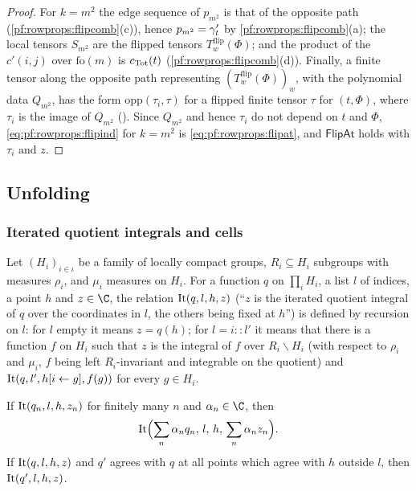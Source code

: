 \begin{proof}
For $k=m^2$ the edge sequence of $p_{m^2}$ is that of the opposite path (\cref{pf:rowprops:flipcomb}(c)), hence
$p_{m^2}=\gamma'_t$ by \cref{pf:rowprops:flipcomb}(a); the local tensors $S_{m^2}$ are the flipped tensors
$T^{\mathrm{flip}}_w(\Phi)$; and the product of the $c'(i,j)$ over $\mathrm{fo}(m)$ is $c_{\mathrm{Tot}}(t)$
(\cref{pf:rowprops:flipcomb}(d)). Finally, a finite tensor along the opposite path representing $(T^{\mathrm{flip}}_w(\Phi))_w$,
with the polynomial data $Q_{m^2}$, has the form $\mathrm{opp}(\tau_i,\tau)$ for a flipped finite tensor $\tau$ for $(t,\Phi)$,
where $\tau_i$ is the image of $Q_{m^2}$ ().
Since $Q_{m^2}$ and hence $\tau_i$ do not depend on $t$ and $\Phi$, \eqref{eq:pf:rowprops:flipind} for $k=m^2$ is
\eqref{eq:pf:rowprops:flipat}, and $\mathsf{FlipAt}$ holds with $\tau_i$ and $z$.
\end{proof}

\subsection{Unfolding}\label{sec:pf:rowprops:unfold}

\subsubsection{Iterated quotient integrals and cells}
\begin{definition}\label{def:pf:rowprops:niter}
Let $(H_i)_{i\in\iota}$ be a family of locally compact groups, $R_i\subseteq H_i$ subgroups with measures $\rho_i$, and
$\mu_i$ measures on $H_i$. For a function $q$ on $\prod_iH_i$, a list $l$ of indices, a point $h$ and $z\in\C$, the relation
$\mathrm{It}(q,l,h,z)$ (``$z$ is the iterated quotient integral of $q$ over the coordinates in $l$, the others being
fixed at $h$'') is defined by recursion on $l$: for $l$ empty it means $z=q(h)$; for $l=i::l'$ it means that there is a
function $f$ on $H_i$ such that $z$ is the integral of $f$ over $R_i\backslash H_i$ (with respect to $\rho_i$ and $\mu_i$,
$f$ being left $R_i$-invariant and integrable on the quotient) and $\mathrm{It}(q,l',h[i\leftarrow g],f(g))$ for every
$g\in H_i$.
\end{definition}

\begin{lemma}[Linearity]\label{pf:rowprops:niterlin}
If $\mathrm{It}(q_n,l,h,z_n)$ for finitely many $n$ and $\alpha_n\in\C$, then
\[
\mathrm{It}\Bigl(\sum_n\alpha_nq_n,\,l,\,h,\,\sum_n\alpha_nz_n\Bigr).
\]
If $\mathrm{It}(q,l,h,z)$ and $q'$ agrees with $q$ at all points which agree with $h$ outside $l$, then
$\mathrm{It}(q',l,h,z)$.
\end{lemma}

